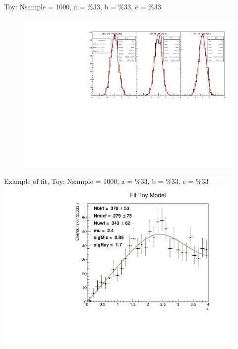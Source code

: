 \documentclass[9pt]{beamer}
\begin{document}
\begin{frame}{Toy: Nsample = 1000, a = $ \%33$, b = $\%33$, c = $\%33$}
\begin{figure}
\includegraphics[width = 1\textwidth]{N1000/Toy(33,33,33).pdf} 
\end{figure}
\end{frame}

\begin{frame}{Example of fit, Toy: Nsample = 1000, a = $ \%33$, b = $\%33$, c = $\%33$}
\includegraphics[width = 0.9\textwidth]{N1000/FitToy(33,33,33).pdf} 
\begin{figure}
\end{figure}
\end{frame}
\end{document}
